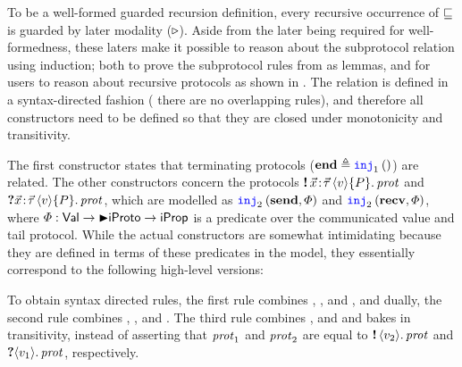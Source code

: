 To be a well-formed guarded recursion definition, every
recursive occurrence of $\sqsubseteq$ is guarded by later modality ($\mathop{{\triangleright}}$).
Aside from the later being required for well-formedness,
these laters make it possible to reason about
the subprotocol relation using  induction; both to prove the
subprotocol rules from  as lemmas, and for \lname users to
reason about recursive protocols as shown in .
The relation is defined in a syntax-directed fashion (\ie
there are no overlapping rules), and therefore all constructors need to be
defined so that they are closed under monotonicity and transitivity.

The first constructor states that terminating protocols ($\protend \eqdef
\Inj 1 \TT$) are related.
The other constructors concern the protocols
$\sendprot{\xdots}{\val}{\iprop}{\prot}$ and
$\recvprot{\xdots}{\val}{\iprop}{\prot}$, which are modelled
as $\Inj 2 {(\actionsend,\pred)}$ and $\Inj 2 {(\actionrecv,\pred)}$, where
$\varPhi : \mathsf{Val} \to \mathord{\blacktriangleright} \mathsf{iProto} \to \mathsf{iProp}$
is a predicate over the communicated value and tail protocol.
While the actual constructors are somewhat intimidating because they are defined
in terms of these predicates in the model, they
essentially correspond to the following high-level versions:
%
%
To obtain syntax directed rules, the first rule combines ,
, and , and dually, the second
rule combines , , and
.
The third rule combines ,  and
 and bakes in transitivity, instead of asserting
that $\mathit{prot}_1$ and $\mathit{prot}_2$ are equal to $\sendprotT {} {\val_2} {\prot}$ and
$\recvprotT {} {\val_1} {\prot}$, respectively.

